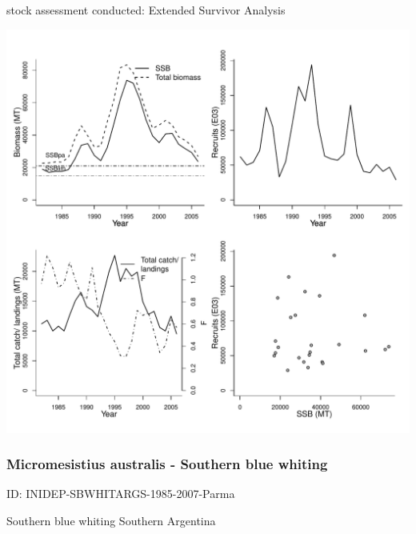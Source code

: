 stock assessment conducted: Extended Survivor Analysis 
\begin{center}
\vspace{-0.2cm}\includegraphics[scale=0.65]{../tex/figures/plot-WGSSDS-WHITVIIek-1982-2007-JENNINGS.pdf}
\end{center}

\newpage
\subsubsection{Micromesistius australis - Southern blue whiting}
ID: INIDEP-SBWHITARGS-1985-2007-Parma

 Southern blue whiting Southern Argentina 

